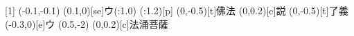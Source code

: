 \documentclass[m_shidai]{subfiles}
\begin{document}
{[1]{\lw}\aki{\q}\qyu{}}
{\qyu\moveTo(-0.1,-0.1)\iro{\c}\sho{}%
\iro{\c}\sho\tsuya{\q}}
{\lwoo{}\tsuya{\q}%
\aki{}\ooyu{\q}\kili[e]\moji(0.1,0)[se]{ウ}\base(\s:1.0)%
\modori*(\w:1.2)[p]\orisute\iro{\k}\sho\iro[2]{\k}\sho}
\karifu(0,-0.5)[t]{佛法}
{\sho\tsuya{\q}\tsu{}\aki\tsuya{\q}}
\newline
\karifu(0,0.2)[c]{説}{\qyu}
\karifu(0,-0.5)[t]{了義}{\sho\tsuya{\q}\aki\tsuya{\q}}
\newline
\newline
{}
{\chikara{\lw}\aki{\q}\aki{\q}\qyu\矢[e]}%
{\aki\tsuyamochi{\q}\moji(-0.3,0)[e]{ウ}\sho%
\moveTo(0.5,-2)\iro{\c}\sho\tsuya{\q}}%
\karifu(0,0.2)[c]{法涌菩薩}%
{\qyu\矢[e]\aki\qyu\長[e]%
\kak{}%
\kak\矢[s]\tsu}%
\end{document}
